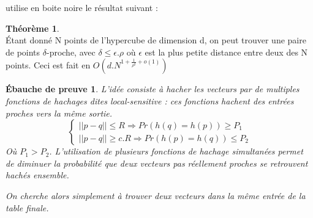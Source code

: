 \documentclass{article}		%
\theoremstyle{definition}
\newtheorem{theo}{Théorème}
\theoremstyle{plain}
\newtheorem{intui}{Ébauche de preuve}
\theoremstyle{plain}
\theoremstyle{plain}
\theoremstyle{plain}
\begin{document}
\cite{Grigo} utilise en boite noire le résultat suivant :
\begin{framed}
\begin{theo}\cite{Indyk}
            \\ Étant donné N points de l'hypercube de dimension d, on peut
      trouver une paire de points $\delta$-proche, avec $\delta \leq
      \epsilon.\rho$ où $\epsilon$ est la plus petite distance entre deux
       des N points. Ceci est fait en $O(d.N^{1+\frac{1}{\rho^2}+o(1)})$
\end{theo}
\begin{intui}

L'idée consiste à hacher les vecteurs par de multiples fonctions de
hachages dites \emph{local-sensitive} : ces fonctions hachent des entrées
proches vers la même sortie. $$\begin{cases} ||p-q||\leq R \Rightarrow
Pr(h(q)=h(p))\geq P_1 \\||p-q||\geq c.R \Rightarrow Pr(h(p)=h(q))\leq P_2
\end{cases} $$ Où  $P_1 > P_2$. L'utilisation de plusieurs fonctions de
hachage simultanées permet de diminuer la probabilité que deux vecteurs
pas réellement proches se retrouvent hachés ensemble.

On cherche
alors simplement à trouver deux vecteurs dans la même entrée de la table
finale.  
\end{intui}
\end{framed}
\end{document}
